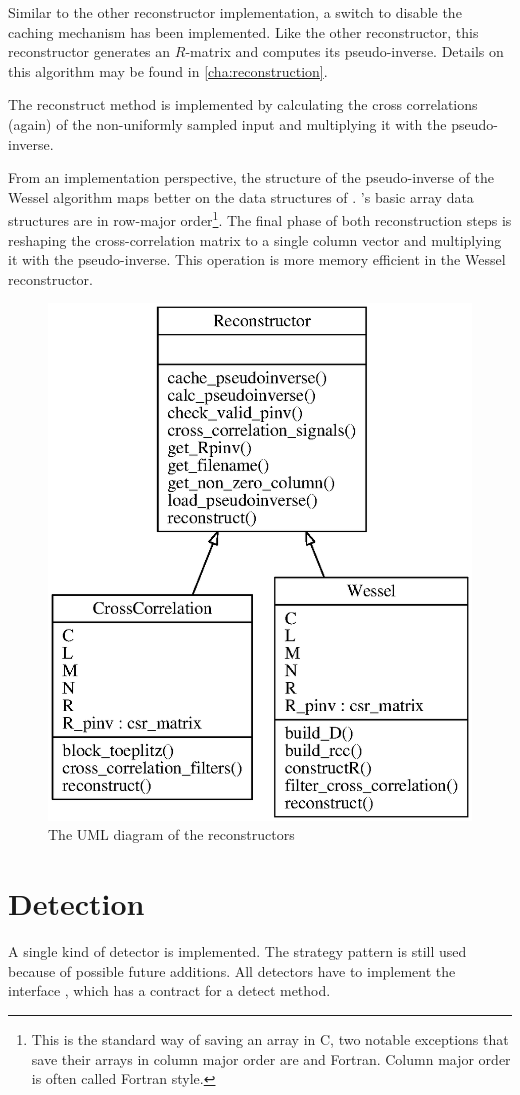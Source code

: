 \documentclass[a4paper, openany, oneside]{memoir}
\begin{document}
Similar to the other reconstructor implementation, a switch to disable the caching mechanism has been implemented. Like the other reconstructor, this reconstructor generates an $R$-matrix and computes its pseudo-inverse. Details on this algorithm may be found in \cref{cha:reconstruction}.

The reconstruct method is implemented by calculating the cross correlations (again) of the non-uniformly sampled input and multiplying it with the pseudo-inverse.

From an implementation perspective, the structure of the pseudo-inverse of the Wessel algorithm maps better on the data structures of . 's basic array data structures are in row-major order\footnote{This is the standard way of saving an array in C, two notable exceptions that save their arrays in column major order are \matlab{} and Fortran. Column major order is often called Fortran style.}. The final phase of both reconstruction steps is reshaping the cross-correlation matrix to a single column vector and multiplying it with the pseudo-inverse. This operation is more memory efficient in the Wessel reconstructor.

\begin{figure}
    \centering
    \includegraphics[width=0.5\linewidth]{./figures/classes_reconstruction.eps}
    \caption{The UML diagram of the reconstructors}
    \label{fig:umlreconstructor}
\end{figure}

\section{Detection}
\label{sec:detection}
A single kind of detector is implemented. The strategy pattern is still used because of possible future additions. All detectors have to implement the interface , which has a contract for a detect method.
\end{document}
